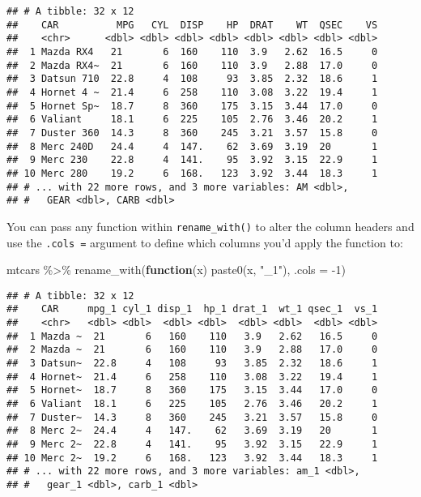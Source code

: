 \documentclass[
]{book}
\newenvironment{Shaded}{\begin{snugshade}}{\end{snugshade}}
\newcommand{\AttributeTok}[1]{\textcolor[rgb]{0.77,0.63,0.00}{#1}}
\newcommand{\ControlFlowTok}[1]{\textcolor[rgb]{0.13,0.29,0.53}{\textbf{#1}}}
\newcommand{\DecValTok}[1]{\textcolor[rgb]{0.00,0.00,0.81}{#1}}
\newcommand{\FunctionTok}[1]{\textcolor[rgb]{0.00,0.00,0.00}{#1}}
\newcommand{\NormalTok}[1]{#1}
\newcommand{\SpecialCharTok}[1]{\textcolor[rgb]{0.00,0.00,0.00}{#1}}
\newcommand{\StringTok}[1]{\textcolor[rgb]{0.31,0.60,0.02}{#1}}
\begin{document}
\begin{verbatim}
## # A tibble: 32 x 12
##    CAR          MPG   CYL  DISP    HP  DRAT    WT  QSEC    VS
##    <chr>      <dbl> <dbl> <dbl> <dbl> <dbl> <dbl> <dbl> <dbl>
##  1 Mazda RX4   21       6  160    110  3.9   2.62  16.5     0
##  2 Mazda RX4~  21       6  160    110  3.9   2.88  17.0     0
##  3 Datsun 710  22.8     4  108     93  3.85  2.32  18.6     1
##  4 Hornet 4 ~  21.4     6  258    110  3.08  3.22  19.4     1
##  5 Hornet Sp~  18.7     8  360    175  3.15  3.44  17.0     0
##  6 Valiant     18.1     6  225    105  2.76  3.46  20.2     1
##  7 Duster 360  14.3     8  360    245  3.21  3.57  15.8     0
##  8 Merc 240D   24.4     4  147.    62  3.69  3.19  20       1
##  9 Merc 230    22.8     4  141.    95  3.92  3.15  22.9     1
## 10 Merc 280    19.2     6  168.   123  3.92  3.44  18.3     1
## # ... with 22 more rows, and 3 more variables: AM <dbl>,
## #   GEAR <dbl>, CARB <dbl>
\end{verbatim}

You can pass any function within \texttt{rename\_with()} to alter the column headers and use the \texttt{.cols\ =} argument to define which columns you'd apply the function to:

\begin{Shaded}
\begin{Highlighting}[]
\NormalTok{mtcars }\SpecialCharTok{\%\textgreater{}\%} \FunctionTok{rename\_with}\NormalTok{(}\ControlFlowTok{function}\NormalTok{(x) }\FunctionTok{paste0}\NormalTok{(x, }\StringTok{"\_1"}\NormalTok{), }\AttributeTok{.cols =} \SpecialCharTok{{-}}\DecValTok{1}\NormalTok{)}
\end{Highlighting}
\end{Shaded}

\begin{verbatim}
## # A tibble: 32 x 12
##    CAR     mpg_1 cyl_1 disp_1  hp_1 drat_1  wt_1 qsec_1  vs_1
##    <chr>   <dbl> <dbl>  <dbl> <dbl>  <dbl> <dbl>  <dbl> <dbl>
##  1 Mazda ~  21       6   160    110   3.9   2.62   16.5     0
##  2 Mazda ~  21       6   160    110   3.9   2.88   17.0     0
##  3 Datsun~  22.8     4   108     93   3.85  2.32   18.6     1
##  4 Hornet~  21.4     6   258    110   3.08  3.22   19.4     1
##  5 Hornet~  18.7     8   360    175   3.15  3.44   17.0     0
##  6 Valiant  18.1     6   225    105   2.76  3.46   20.2     1
##  7 Duster~  14.3     8   360    245   3.21  3.57   15.8     0
##  8 Merc 2~  24.4     4   147.    62   3.69  3.19   20       1
##  9 Merc 2~  22.8     4   141.    95   3.92  3.15   22.9     1
## 10 Merc 2~  19.2     6   168.   123   3.92  3.44   18.3     1
## # ... with 22 more rows, and 3 more variables: am_1 <dbl>,
## #   gear_1 <dbl>, carb_1 <dbl>
\end{verbatim}
\end{document}
